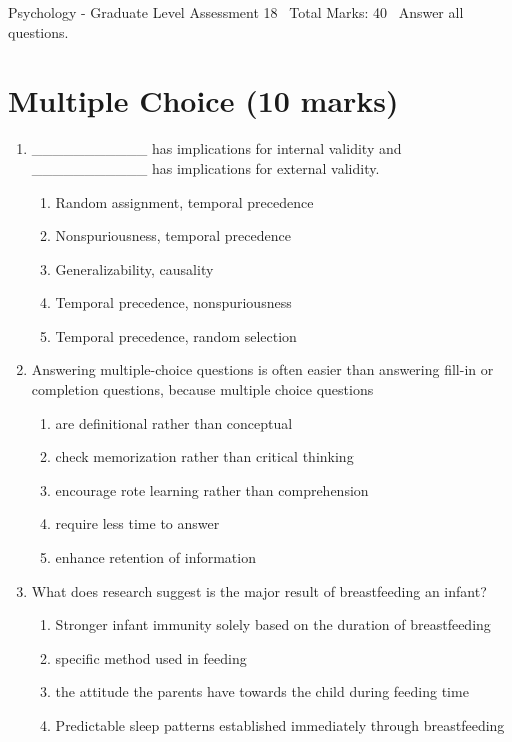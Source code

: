 \documentclass[12pt]{article}
\begin{document}
\begin{center}
Psychology - Graduate Level Assessment 18 \
Total Marks: 40 \
Answer all questions.
\end{center}

\section*{Multiple Choice (10 marks)}
\begin{enumerate}[label=\arabic*.]
\item \_\_\_\_\_\_\_\_\_\_\_ has implications for internal validity and \_\_\_\_\_\_\_\_\_\_\_ has implications for external validity.
\begin{enumerate}[label=(\alph*)]
    \item Random assignment, temporal precedence
    \item Nonspuriousness, temporal precedence
    \item Generalizability, causality
    \item Temporal precedence, nonspuriousness
    \item Temporal precedence, random selection
\end{enumerate}
\item Answering multiple-choice questions is often easier than answering fill-in or completion questions, because multiple choice questions
\begin{enumerate}[label=(\alph*)]
    \item are definitional rather than conceptual
    \item check memorization rather than critical thinking
    \item encourage rote learning rather than comprehension
    \item require less time to answer
    \item enhance retention of information
\end{enumerate}
\item What does research suggest is the major result of breastfeeding an infant?
\begin{enumerate}[label=(\alph*)]
    \item Stronger infant immunity solely based on the duration of breastfeeding
    \item specific method used in feeding
    \item the attitude the parents have towards the child during feeding time
    \item Predictable sleep patterns established immediately through breastfeeding

\end{enumerate}
\end{enumerate}
\end{document}
